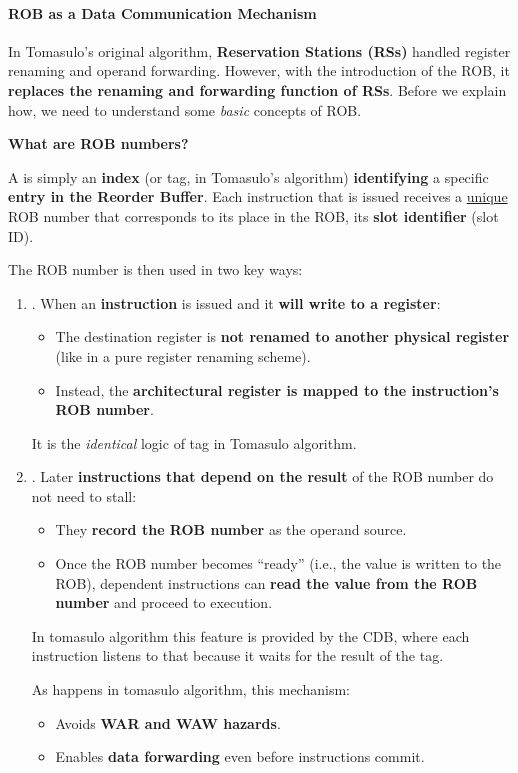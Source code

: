 \paragraph{ROB as a Data Communication Mechanism}

In Tomasulo's original algorithm, \textbf{Reservation Stations (RSs)} handled register renaming and operand forwarding. However, with the introduction of the ROB, it \textbf{replaces the renaming and forwarding function of RSs}. Before we explain how, we need to understand some \emph{basic} concepts of ROB.

\highspace
\begin{flushleft}
    \textcolor{Green3}{ \textbf{What are ROB numbers?}}
\end{flushleft}
A  is simply an \textbf{index} (or tag, in Tomasulo's algorithm) \textbf{identifying} a specific \textbf{entry in the Reorder Buffer}. Each instruction that is issued receives a \underline{unique} ROB number that corresponds to its place in the ROB, its \textbf{slot identifier} (slot ID).

\highspace
The ROB number is then used in two key ways:
\begin{enumerate}
    \item {}. When an \textbf{instruction} is issued and it \textbf{will write to a register}:
    \begin{itemize}
        \item The destination register is \textbf{not renamed to another physical register} (like in a pure register renaming scheme).
        \item Instead, the \textbf{architectural register is mapped to the instruction's ROB number}.
    \end{itemize}
    It is the \emph{identical} logic of tag in Tomasulo algorithm.

    \item {}. Later \textbf{instructions that depend on the result} of the ROB number do not need to stall:
    \begin{itemize}
        \item They \textbf{record the ROB number} as the operand source.
        \item Once the ROB number becomes ``ready'' (i.e., the value is written to the ROB), dependent instructions can \textbf{read the value from the ROB number} and proceed to execution.
    \end{itemize}
    In tomasulo algorithm this feature is provided by the CDB, where each instruction listens to that because it waits for the result of the tag.

    As happens in tomasulo algorithm, this mechanism:
    \begin{itemize}[label=\textcolor{Green3}{}]
        \item Avoids \textbf{WAR and WAW hazards}.
        \item Enables \textbf{data forwarding} even before instructions commit.
    \end{itemize}
\end{enumerate}

